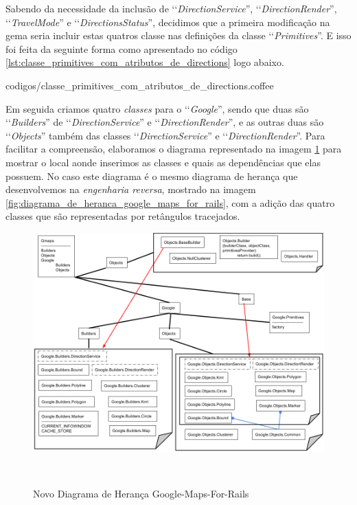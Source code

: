 Sabendo da necessidade da inclusão de ‘‘\emph{DirectionService}'', ‘‘\emph{DirectionRender}'',
‘‘\emph{TravelMode}'' e ‘‘\emph{DirectionsStatus}'', decidimos que a primeira modificação na gema seria 
incluir estas quatros classe nas definições da classe ‘‘\emph{Primitives}''. E isso foi 
feita da seguinte forma como apresentado no código \ref{lst:classe_primitives_com_atributos_de_directions}
logo abaixo.


{codigos/classe_primitives_com_atributos_de_directions.coffee}

Em seguida criamos quatro \emph{classes} para o ‘‘\emph{Google}'', sendo que duas são ‘‘\emph{Builders}'' de 
‘‘\emph{DirectionService}'' e ‘‘\emph{DirectionRender}'', e as outras duas são ‘‘\emph{Objects}'' também das 
classes ‘‘\emph{DirectionService}'' e ‘‘\emph{DirectionRender}''. Para facilitar a compreensão, elaboramos o 
diagrama representado na imagem \ref{fig:novo_diagrama_de_heranca_google_maps_for_rails} para mostrar o
local aonde inserimos as classes e quais as dependências que elas possuem. No caso este diagrama é o mesmo
diagrama de herança que desenvolvemos na \emph{engenharia reversa}, mostrado na imagem
\ref{fig:diagrama_de_heranca_google_maps_for_rails}, com a adição das quatro classes que são representadas 
por retângulos tracejados.

\begin{figure}[ht]
  \begin{center}
    \includegraphics[scale=0.35]{images/novo_diagrama_de_heranca_google_maps_for_rails.png}
    \caption{Novo Diagrama de Herança Google-Maps-For-Rails}
    \label{fig:novo_diagrama_de_heranca_google_maps_for_rails}
  \end{center}  \
\end{figure}

